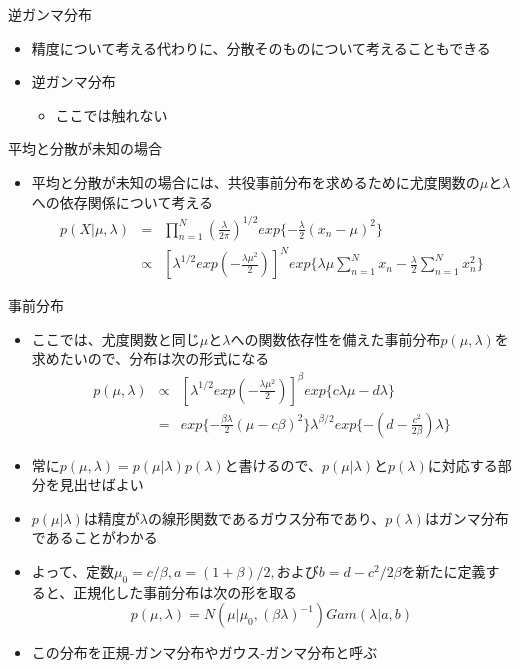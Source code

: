 \begin{frame}{逆ガンマ分布}
 \begin{itemize}
  \item 精度について考える代わりに、分散そのものについて考えることもできる
  \item 逆ガンマ分布
        \begin{itemize}
         \item ここでは触れない
        \end{itemize}
 \end{itemize}
\end{frame}

\begin{frame}{平均と分散が未知の場合}
 \begin{itemize}
  \item \alert{平均と分散が未知}の場合には、共役事前分布を求めるために尤度関数の$\mu$と$\lambda$への依存関係について考える
        \begin{eqnarray}
         p(X|\mu,\lambda) &=& \prod_{n=1}^{N}(\frac{\lambda}{2\pi})^{1/2}exp\{-\frac{\lambda}{2}(x_n-\mu)^2\} \nonumber \\
         &\propto & [\lambda^{1/2}exp(-\frac{\lambda\mu^2}{2})]^{N}exp\{\lambda\mu\sum_{n=1}^{N}x_n-\frac{\lambda}{2}\sum_{n=1}^{N}x_n^2\}
        \end{eqnarray}
 \end{itemize}
\end{frame}

\begin{frame}{事前分布}
 \begin{itemize}
  \item ここでは、尤度関数と同じ$\mu$と$\lambda$への関数依存性を備えた事前分布$p(\mu,\lambda)$を求めたいので、分布は次の形式になる
        \begin{eqnarray}
         p(\mu,\lambda) &\propto& [\lambda^{1/2}exp(-\frac{\lambda\mu^2}{2})]^\beta exp\{c\lambda\mu-d\lambda\} \nonumber \\
         &= & exp\{-\frac{\beta\lambda}{2}(\mu-c\beta)^2\}\lambda^{\beta/2}exp\{-(d-\frac{c^2}{2\beta})\lambda\}
        \end{eqnarray}
  \item 常に$p(\mu,\lambda)=p(\mu|\lambda)p(\lambda)$と書けるので、$p(\mu|\lambda)$と$p(\lambda)$に対応する部分を見出せばよい
  \item $p(\mu|\lambda)$は精度が$\lambda$の線形関数であるガウス分布であり、$p(\lambda)$はガンマ分布であることがわかる
  \item よって、定数$\mu_0=c/\beta, a=(1+\beta)/2,$および$b=d-c^2/2\beta$を新たに定義すると、正規化した事前分布は次の形を取る
        \begin{equation}
         p(\mu,\lambda)=N(\mu|\mu_0, (\beta\lambda)^{-1})Gam(\lambda|a,b)
        \end{equation}
  \item この分布を\alert{正規-ガンマ分布}や\alert{ガウス-ガンマ分布}と呼ぶ
 \end{itemize}
\end{frame}

